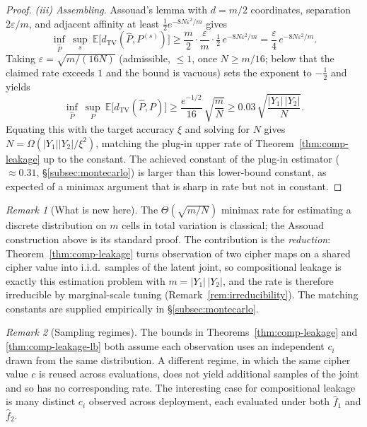 \documentclass[conference]{IEEEtran}
\theoremstyle{definition}
\theoremstyle{plain}
\theoremstyle{remark}
\newtheorem{remark}{Remark}[section]
\newcommand{\fhat}{\hat{f}}
\newcommand{\TV}{d_{\mathrm{TV}}}
\begin{document}
\begin{proof}
\emph{(iii) Assembling.}  Assouad's lemma with $d = m/2$ coordinates,
separation $2\varepsilon/m$, and adjacent affinity at least
$\tfrac12 e^{-8N\varepsilon^2/m}$ gives
\[
\inf_{\hat P}\ \sup_{s}\ \mathbb{E}\bigl[\TV(\hat P, P^{(s)})\bigr]
  \geq \frac{m}{2}\cdot\frac{\varepsilon}{m}\cdot
       \tfrac12\, e^{-8N\varepsilon^2/m}
  = \frac{\varepsilon}{4}\, e^{-8N\varepsilon^2/m}.
\]
Taking $\varepsilon = \sqrt{m/(16N)}$ (admissible, $\le 1$, once
$N \geq m/16$; below that the claimed rate exceeds $1$ and the bound is
vacuous) sets the exponent to $-\tfrac12$ and yields
\[
\inf_{\hat P}\ \sup_{P}\ \mathbb{E}\bigl[\TV(\hat P, P)\bigr]
  \geq \frac{e^{-1/2}}{16}\,\sqrt{\frac{m}{N}}
  \geq 0.03\,\sqrt{\frac{|Y_1|\,|Y_2|}{N}}.
\]
Equating this with the target accuracy $\xi$ and solving for $N$ gives
$N = \Omega(|Y_1||Y_2|/\xi^2)$, matching the plug-in upper rate of
Theorem~\ref{thm:comp-leakage} up to the constant.  The achieved
constant of the plug-in estimator ($\approx 0.31$, \S\ref{subsec:montecarlo})
is larger than this lower-bound constant, as expected of a minimax
argument that is sharp in rate but not in constant.
\end{proof}

\begin{remark}[What is new here]
The $\Theta(\sqrt{m/N})$ minimax rate for estimating a discrete
distribution on $m$ cells in total variation is classical; the Assouad
construction above is its standard proof.  The contribution is the
\emph{reduction}: Theorem~\ref{thm:comp-leakage} turns observation of two
cipher maps on a shared cipher value into i.i.d.\ samples of the latent
joint, so compositional leakage is exactly this estimation problem with
$m = |Y_1|\,|Y_2|$, and the rate is therefore irreducible by
marginal-scale tuning (Remark~\ref{rem:irreducibility}).  The matching
constants are supplied empirically in \S\ref{subsec:montecarlo}.
\end{remark}

\begin{remark}[Sampling regimes]
The bounds in Theorems~\ref{thm:comp-leakage} and
\ref{thm:comp-leakage-lb} both assume each observation uses an
independent $c_i$ drawn from the same distribution.  A different
regime, in which the same cipher value $c$ is reused across
evaluations, does not yield additional samples of the joint and so has
no corresponding rate.  The interesting case for compositional leakage
is many distinct $c_i$ observed across deployment, each evaluated
under both $\fhat_1$ and $\fhat_2$.
\end{remark}
\end{document}
